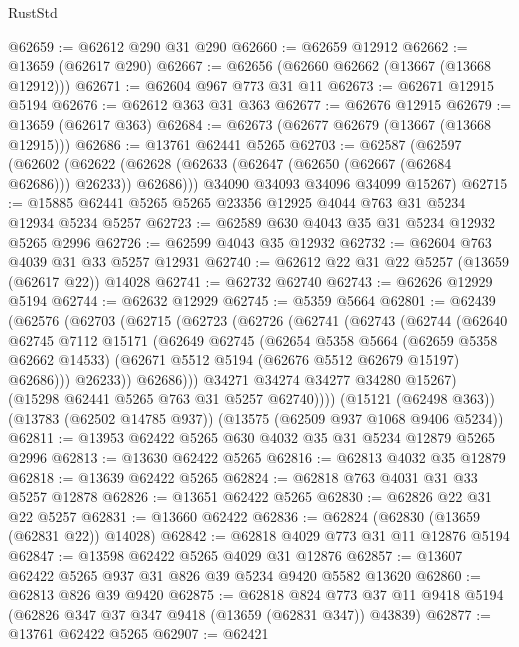 \begin{lexlean}{RustStd}
\begin{coremodule}
@62659 := @62612 @290 @31 @290
@62660 := @62659 @12912
@62662 := @13659 (@62617 @290)
@62667 := @62656 (@62660 @62662 (@13667 (@13668 @12912)))
@62671 := @62604 @967 @773 @31 @11
@62673 := @62671 @12915 @5194
@62676 := @62612 @363 @31 @363
@62677 := @62676 @12915
@62679 := @13659 (@62617 @363)
@62684 := @62673 (@62677 @62679 (@13667 (@13668 @12915)))
@62686 := @13761 @62441 @5265
@62703 := @62587
    (@62597
      (@62602 (@62622 (@62628 (@62633 (@62647 (@62650 (@62667 (@62684 @62686))) @26233)) @62686)))
      @34090
      @34093
      @34096
      @34099
      @15267)
@62715 := @15885 @62441 @5265 @5265 @23356 @12925 @4044 @763 @31 @5234 @12934 @5234 @5257
@62723 := @62589 @630 @4043 @35 @31 @5234 @12932 @5265 @2996
@62726 := @62599 @4043 @35 @12932
@62732 := @62604 @763 @4039 @31 @33 @5257 @12931
@62740 := @62612 @22 @31 @22 @5257 (@13659 (@62617 @22)) @14028
@62741 := @62732 @62740
@62743 := @62626 @12929 @5194
@62744 := @62632 @12929
@62745 := @5359 @5664
@62801 := @62439
    (@62576
      (@62703
        (@62715
          (@62723
            (@62726
              (@62741
                (@62743
                  (@62744
                    (@62640
                      @62745
                      @7112
                      @15171
                      (@62649
                        @62745
                        (@62654
                          @5358
                          @5664
                          (@62659 @5358 @62662 @14533)
                          (@62671 @5512 @5194 (@62676 @5512 @62679 @15197) @62686)))
                      @26233))
                  @62686)))
            @34271
            @34274
            @34277
            @34280
            @15267)
          (@15298 @62441 @5265 @763 @31 @5257 @62740))))
    (@15121 (@62498 @363))
    (@13783 (@62502 @14785 @937))
    (@13575 (@62509 @937 @1068 @9406 @5234))
@62811 := @13953 @62422 @5265 @630 @4032 @35 @31 @5234 @12879 @5265 @2996
@62813 := @13630 @62422 @5265
@62816 := @62813 @4032 @35 @12879
@62818 := @13639 @62422 @5265
@62824 := @62818 @763 @4031 @31 @33 @5257 @12878
@62826 := @13651 @62422 @5265
@62830 := @62826 @22 @31 @22 @5257
@62831 := @13660 @62422
@62836 := @62824 (@62830 (@13659 (@62831 @22)) @14028)
@62842 := @62818 @4029 @773 @31 @11 @12876 @5194
@62847 := @13598 @62422 @5265 @4029 @31 @12876
@62857 := @13607 @62422 @5265 @937 @31 @826 @39 @5234 @9420 @5582 @13620
@62860 := @62813 @826 @39 @9420
@62875 := @62818
    @824
    @773
    @37
    @11
    @9418
    @5194
    (@62826 @347 @37 @347 @9418 (@13659 (@62831 @347)) @43839)
@62877 := @13761 @62422 @5265
@62907 := @62421

\end{coremodule}
\end{lexlean}
